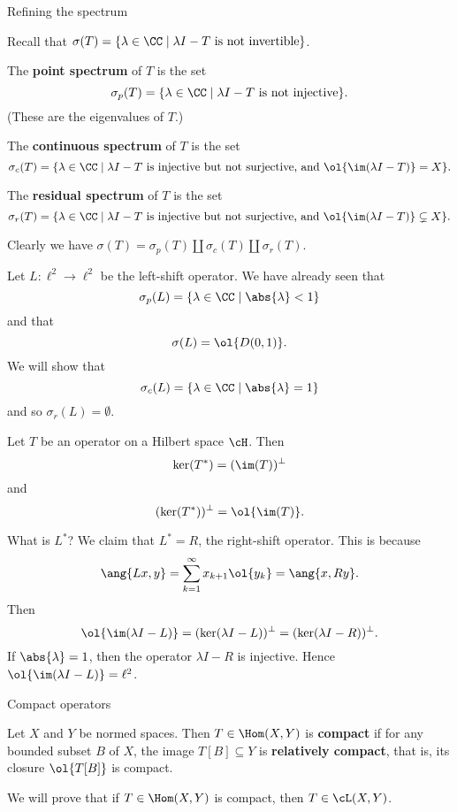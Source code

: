 Refining the spectrum

Recall that $\sigma(T) = \{ \lambda\in\CC \mid \lambda I-T \text{ is not invertible} \}$.

\begin{defn}
  \lv
  \begin{enum}
    \io
    The \textbf{point spectrum} of $T$ is the set
    \[ \sigma_p(T) = \{ \lambda \in \CC \mid \lambda I-T \text{ is not injective} \}. \]
    (These are the eigenvalues of $T$.)

    \io
    The \textbf{continuous spectrum} of $T$ is the set
    \[ \sigma_c(T) = \{ \lambda \in \CC \mid \lambda I-T \text{ is injective but not surjective, and } \ol{\im(\lambda I-T)}=X\}. \]

    \io
    The \textbf{residual spectrum} of $T$ is the set
    \[ \sigma_r(T) = \{ \lambda \in \CC \mid \lambda I-T \text{ is injective but not surjective, and } \ol{\im(\lambda I-T)} \subsetneq X\}. \]
  \end{enum}
  Clearly we have $\sigma(T) = \sigma_p(T) \amalg \sigma_c(T) \amalg \sigma_r(T)$.
\end{defn}

\begin{exam}
  Let $L: \ell^2 \to \ell^2$ be the left-shift operator.
  We have already seen that
  \[ \sigma_p(L) = \{ \lambda \in \CC \mid \abs{\lambda}<1 \} \]
  and that
  \[ \sigma(L) = \ol{D(0,1)}. \]
  We will show that
  \[ \sigma_c(L) = \{ \lambda \in \CC \mid \abs{\lambda}=1 \} \]
  and so $\sigma_r(L) = \emptyset$.

  \begin{exer}
    Let $T$ be an operator on a Hilbert space $\cH$.
    Then
    \[ \ker(T^*) = (\im(T))^\perp \]
    and
    \[ (\ker(T^*))^\perp = \ol{\im(T)}. \]
  \end{exer}

  What is $L^*$?
  We claim that $L^*=R$, the right-shift operator.
  This is because
  \[ \ang{Lx,y} = \sum_{k=1}^\infty x_{k+1}\ol{y_k} = \ang{x,Ry}. \]
  Then
  \[ \ol{\im(\lambda I-L)} = (\ker(\lambda I-L))^\perp = (\ker(\lambda I-R))^\perp. \]
  If $\abs{\lambda}=1$, then the operator $\lambda I-R$ is injective.
  Hence $\ol{\im(\lambda I-L)}=\ell^2$.
\end{exam}

Compact operators

\begin{defn}
  Let $X$ and $Y$ be normed spaces.
  Then $T \in \Hom(X,Y)$ is \textbf{compact} if for any bounded subset $B$ of $X$, the image $T[B] \subseteq Y$ is \textbf{relatively compact}, that is, its closure $\ol{T[B]}$ is compact.
\end{defn}

\begin{rmk}
  We will prove that if $T \in \Hom(X,Y)$ is compact, then $T \in \cL(X,Y)$.
\end{rmk}
